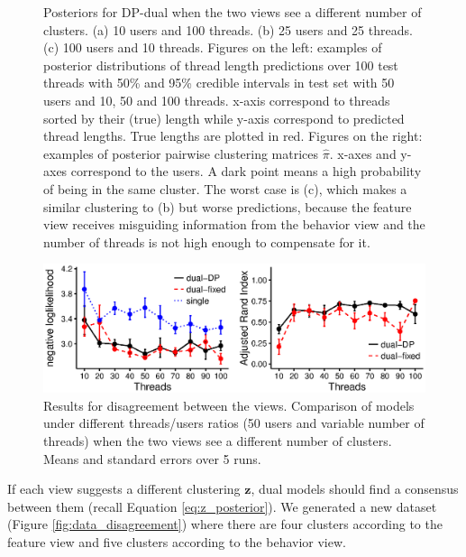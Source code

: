 \documentclass[smallextended]{svjour3}          %
\begin{document}
\begin{figure}
	\centering
	\caption{Posteriors for DP-dual when the two views see a different number of clusters. (a) 10 users and 100 threads. (b) 25 users and 25 threads. (c) 100 users and 10 threads. Figures on the left: examples of posterior distributions of thread length predictions over 100 test threads with 50\% and 95\% credible intervals in test set with 50 users and 10, 50 and 100 threads. x-axis correspond to threads sorted by their (true) length while y-axis correspond to predicted thread lengths. True lengths are plotted in red. Figures on the right: examples of posterior pairwise clustering matrices $\hat{\pi}$. x-axes and y-axes correspond to the users. A dark point means a high probability of being in the same cluster. The worst case is (c), which makes a similar clustering to (b) but worse predictions, because the feature view receives misguiding information from the behavior view and the number of threads is not high enough to compensate for it.}
	\label{fig:confused}
\end{figure}

\begin{figure}
	\centering

	\includegraphics[width=1\textwidth]{Fig6_results_disagreement_bw}%
	\caption{Results for disagreement between the views. Comparison of models under different threads/users ratios (50 users and variable number of threads) when the two views see a different number of clusters. Means and standard errors over 5 runs.}
	\label{fig:results_disagreement}
\end{figure}



If each view suggests a different clustering $\mathbf{z}$, dual models should find a consensus between them (recall Equation \ref{eq:z_posterior}). We generated a new dataset (Figure \ref{fig:data_disagreement}) where there are four clusters according to the feature view and five clusters according to the behavior view.
\end{document}
